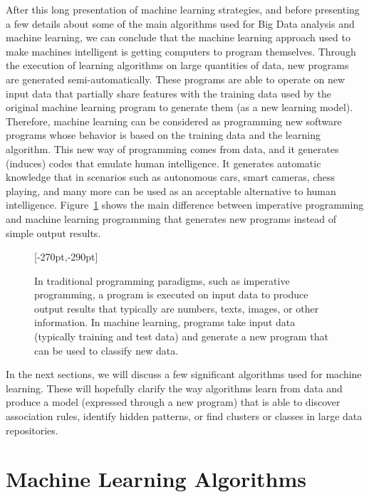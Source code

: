 After this long presentation of machine learning strategies, and before presenting a few details about some of the main algorithms used for Big Data analysis and machine learning, we can conclude that the machine learning approach used to make machines intelligent is getting computers to program themselves. Through the execution of learning algorithms on large quantities of data, new programs are generated semi-automatically. These programs are able to operate on new input data that partially share features with the training data used by the original machine learning program to generate them (as a new learning model). Therefore, machine learning can be considered as programming new software programs whose behavior is based on the training data and the learning algorithm. This new way of programming comes from data, and it generates (induces) codes that emulate human intelligence. It generates automatic knowledge that in scenarios such as autonomous cars, smart cameras, chess playing, and many more can be used as an acceptable alternative to human intelligence. Figure~\ref{fig:4.2} shows the main difference between imperative programming and machine learning programming that generates new programs instead of simple output results.


\begin{figure}[!b]
[-270pt,-290pt]
\caption{\label{fig:4.2}In traditional programming paradigms, such as imperative programming, a program is executed on input data to produce output results that typically are numbers, texts, images, or other information. In machine learning, programs take input data (typically training and test data) and generate a new program that can be used to classify new data.}
\end{figure}

In the next sections, we will discuss a few significant algorithms used for machine learning. These will hopefully clarify the way algorithms learn from data and produce a model (expressed through a new program) that is able to discover association rules, identify hidden patterns, or find clusters or classes in large data repositories.

\section{\label{sec:4.4}Machine Learning Algorithms}

